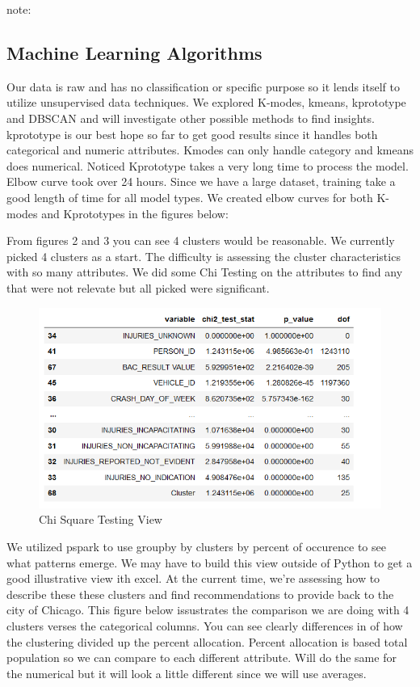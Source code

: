 \documentclass[conference]{IEEEtran}
\begin{document}
 note:

\subsection{Machine Learning Algorithms}
Our data is raw and has no classification or specific purpose so it lends itself to utilize unsupervised data techniques. 
We explored K-modes, kmeans, kprototype and DBSCAN and will investigate other possible methods to find insights. kprototype is our best hope so far to get good results since 
it handles both categorical and numeric attributes.  Kmodes can only handle category and kmeans does numerical. Noticed Kprototype takes a very long time to process the model.  Elbow curve took over 24 hours. Since we have a large dataset, training take a good length of time for all model types.  We created elbow curves for both K-modes and Kprototypes in the figures below:  

 

From figures 2 and 3 you can see 4 clusters would be reasonable.  We currently picked 4 clusters as a start. The difficulty is assessing the 
cluster characteristics with so many attributes.  We did some Chi Testing on the attributes to find any that were not relevate but all picked were significant.
\begin{figure}[!h]
	\includegraphics[width=\linewidth]{Chi Square.png}
	\caption{Chi Square Testing View}
	\label{table: Chi Square Testing View}
\end{figure}
We utilized pspark to use groupby by clusters by percent of occurence to see what patterns emerge.  We may have to build this view outside of Python to get a good illustrative view ith excel.  At the current time, we're assessing how to describe these these clusters and find recommendations to provide back to the city of Chicago. This figure below issustrates the comparison we are doing with 4 clusters verses the categorical columns.  You can see clearly differences in of how the clustering divided up the percent allocation. Percent allocation is based total population so we can compare to each different attribute.  Will do the same for the numerical but it will look a little different since we will use averages.
\end{document}
